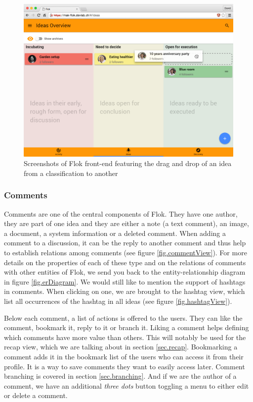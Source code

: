 \documentclass[a4paper,12pt, oneside]{article}
\begin{document}
\begin{figure}[!htb]
    \centering
    \includegraphics[width=\textwidth]{images/classificationDragAndDrop.png}
    \caption{Screenshots of Flok front-end featuring the drag and drop of an idea from a classification to another}
    \label{fig.classificationDragAndDrop}
\end{figure}

\FloatBarrier
\subsubsection{Comments}
\label{sec.comments}
Comments are one of the central components of Flok.
They have one author, they are part of one idea and they are either a note (a text comment), an image, a document, a system information or a deleted comment.
When adding a comment to a discussion, it can be the reply to another comment and thus help to establish relations among comments (see figure \ref{fig.commentView}).
For more details on the properties of each of these type and on the relations of comments with other entities of Flok, we send you back to the entity-relationship diagram in figure \ref{fig.erDiagram}.
We would still like to mention the support of hashtags in comments.
When clicking on one, we are brought to the hashtag view, which list all occurrences of the hashtag in all ideas (see figure \ref{fig.hashtagView}).

Below each comment, a list of actions is offered to the users.
They can like the comment, bookmark it, reply to it or branch it.
Liking a comment helps defining which comments have more value than others.
This will notably be used for the recap view, which we are talking about in section \ref{sec.recap}.
Bookmarking a comment adds it in the bookmark list of the users who can access it from their profile.
It is a way to save comments they want to easily access later.
Comment branching is covered in section \ref{sec.branching}.
And if we are the author of a comment, we have an additional \emph{three dots} button toggling a menu to either edit or delete a comment.
\end{document}

